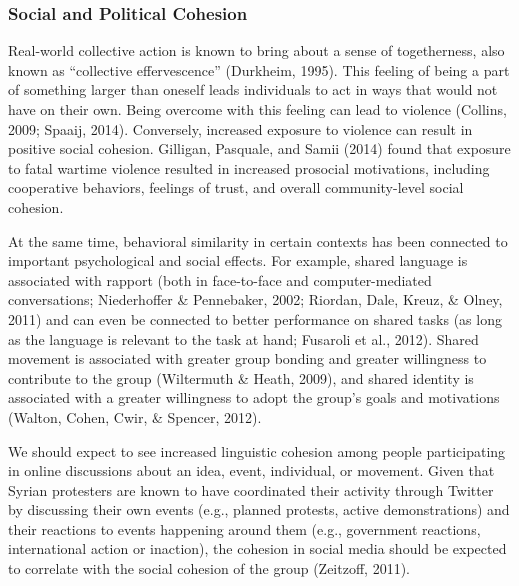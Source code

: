 \documentclass[
  english,
  man]{apa6}
\begin{document}
\hypertarget{social-and-political-cohesion}{%
\subsubsection{Social and Political Cohesion}\label{social-and-political-cohesion}}

Real-world collective action is known to bring about a sense of togetherness,
also known as \enquote{collective effervescence} (Durkheim, 1995). This feeling
of being a part of something larger than oneself leads individuals to act in
ways that would not have on their own. Being overcome with this feeling can lead
to violence (Collins, 2009; Spaaij, 2014). Conversely, increased
exposure to violence can result in positive social cohesion. Gilligan, Pasquale, and Samii (2014)
found that exposure to fatal wartime violence resulted in increased prosocial
motivations, including cooperative behaviors, feelings of trust, and overall
community-level social cohesion.

At the same time, behavioral similarity in certain contexts has been
connected to important psychological and social effects. For example, shared
language is associated with rapport (both in face-to-face and computer-mediated
conversations; Niederhoffer \& Pennebaker, 2002; Riordan, Dale, Kreuz, \& Olney, 2011) and
can even be connected to better performance on shared tasks (as long as
the language is relevant to the task at hand; Fusaroli et al., 2012). Shared
movement is associated with greater group bonding and greater willingness
to contribute to the group (Wiltermuth \& Heath, 2009), and shared identity
is associated with a greater willingness to adopt the group's goals and
motivations (Walton, Cohen, Cwir, \& Spencer, 2012).

We should expect to see increased linguistic cohesion among people participating
in online discussions about an idea, event, individual, or movement. Given that
Syrian protesters are known to have coordinated their activity through Twitter
by discussing their own events (e.g., planned protests, active demonstrations)
and their reactions to events happening around them (e.g., government reactions,
international action or inaction), the cohesion in social media should be
expected to correlate with the social cohesion of the group (Zeitzoff, 2011).
\end{document}
